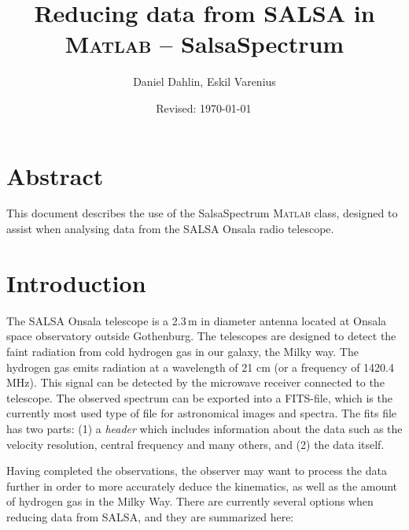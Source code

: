 \documentclass[11pt,a4paper]{article}
\begin{document}
\pagestyle{plain}
\title{\textsf{Reducing data from SALSA in \textsc{Matlab} -- {SalsaSpectrum}}}
\author{\textsf{Daniel Dahlin, Eskil Varenius}}
\yyyymmdddate
\date{\textsf{Revised: \today \, \currenttime}}
 

\maketitle

\section*{Abstract}
This document describes the use of the SalsaSpectrum \textsc{Matlab}
class, designed to assist when analysing data from the SALSA Onsala 
radio telescope. 

\tableofcontents

\section{Introduction}
\label{sec:introduction}

The SALSA Onsala telescope is a 2.3\,m in diameter antenna located at
Onsala space observatory outside Gothenburg. The telescopes are
designed to detect the faint radiation from cold hydrogen gas in our
galaxy, the Milky way. The hydrogen gas emits radiation at a
wavelength of 21 cm (or a frequency of 1420.4 MHz). This signal can be
detected by the microwave receiver connected to the telescope. 
The observed spectrum can be
exported into a FITS-file, which is the currently most used type of
file for astronomical images and spectra. The fits file has two parts:
(1) a \emph{header} which includes information
about the data such as the velocity resolution, central frequency and
many others, and (2) the data itself.

Having completed the observations, the observer may want to process
the data further in order to more accurately deduce the kinematics,
as well as the amount of hydrogen gas in the Milky Way. There are
currently several options when reducing data from SALSA, and they are
summarized here:
\end{document}
